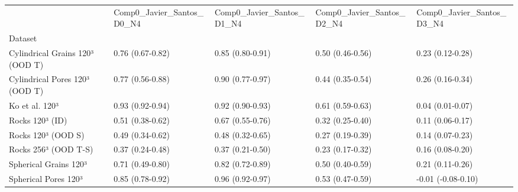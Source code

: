 \begin{tabular}{lllll}
\toprule
 & Comp0_Javier_Santos_D0_N4 & Comp0_Javier_Santos_D1_N4 & Comp0_Javier_Santos_D2_N4 & Comp0_Javier_Santos_D3_N4 \\
Dataset &  &  &  &  \\
\midrule
Cylindrical Grains 120³ (OOD T) & 0.76 (0.67-0.82) & 0.85 (0.80-0.91) & 0.50 (0.46-0.56) & 0.23 (0.12-0.28) \\
Cylindrical Pores 120³ (OOD T) & 0.77 (0.56-0.88) & 0.90 (0.77-0.97) & 0.44 (0.35-0.54) & 0.26 (0.16-0.34) \\
Ko et al. 120³ & 0.93 (0.92-0.94) & 0.92 (0.90-0.93) & 0.61 (0.59-0.63) & 0.04 (0.01-0.07) \\
Rocks 120³ (ID) & 0.51 (0.38-0.62) & 0.67 (0.55-0.76) & 0.32 (0.25-0.40) & 0.11 (0.06-0.17) \\
Rocks 120³ (OOD S) & 0.49 (0.34-0.62) & 0.48 (0.32-0.65) & 0.27 (0.19-0.39) & 0.14 (0.07-0.23) \\
Rocks 256³ (OOD T-S) & 0.37 (0.24-0.48) & 0.37 (0.21-0.50) & 0.23 (0.17-0.32) & 0.16 (0.08-0.20) \\
Spherical Grains 120³ & 0.71 (0.49-0.80) & 0.82 (0.72-0.89) & 0.50 (0.40-0.59) & 0.21 (0.11-0.26) \\
Spherical Pores 120³ & 0.85 (0.78-0.92) & 0.96 (0.92-0.97) & 0.53 (0.47-0.59) & -0.01 (-0.08-0.10) \\
\bottomrule
\end{tabular}
